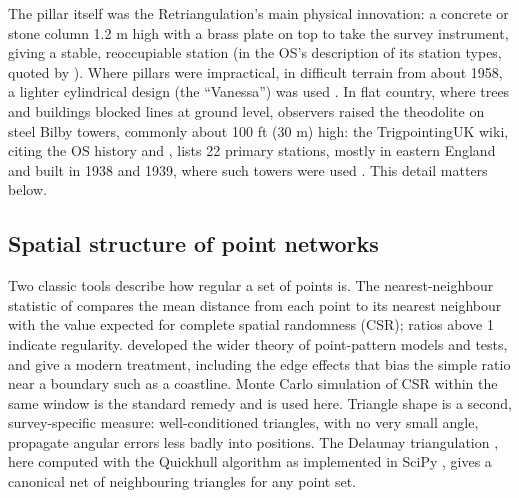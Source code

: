 \documentclass[11pt,a4paper]{article}
\begin{document}
The pillar itself was the Retriangulation's main physical innovation: a concrete or stone column 1.2 m high with a brass plate on top to take the survey instrument, giving a stable, reoccupiable station (in the OS's description of its station types, quoted by \citealt{jones2018}). Where pillars were impractical, in difficult terrain from about 1958, a lighter cylindrical design (the ``Vanessa'') was used \citep{tukpillar}. In flat country, where trees and buildings blocked lines at ground level, observers raised the theodolite on steel Bilby towers, commonly about 100 ft (30 m) high: the TrigpointingUK wiki, citing the OS history and \citet{owen1992}, lists 22 primary stations, mostly in eastern England and built in 1938 and 1939, where such towers were used \citep{tukbilby}. This detail matters below.

\subsection{Spatial structure of point networks}
Two classic tools describe how regular a set of points is. The nearest-neighbour statistic of \citet{clarkevans1954} compares the mean distance from each point to its nearest neighbour with the value expected for complete spatial randomness (CSR); ratios above 1 indicate regularity. \citet{ripley1977} developed the wider theory of point-pattern models and tests, and \citet{baddeley2015} give a modern treatment, including the edge effects that bias the simple ratio near a boundary such as a coastline. Monte Carlo simulation of CSR within the same window is the standard remedy and is used here. Triangle shape is a second, survey-specific measure: well-conditioned triangles, with no very small angle, propagate angular errors less badly into positions. The Delaunay triangulation \citep{delaunay1934}, here computed with the Quickhull algorithm \citep{barber1996} as implemented in SciPy \citep{virtanen2020}, gives a canonical net of neighbouring triangles for any point set.
\end{document}
